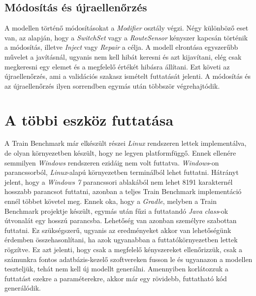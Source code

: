 \subsection{Módosítás és újraellenőrzés}

A modellen történő módosításokat a \emph{Modifier} osztály végzi. Négy különböző eset van, az alapján, hogy a \emph{SwitchSet} vagy a \emph{RouteSensor} kényszer kapcsán történik a módosítás, illetve \emph{Inject} vagy \emph{Repair} a célja. A modell elrontása egyszerűbb művelet a javításnál, ugyanis nem kell hibát keresni és azt kijavítani, elég csak megkeresni egy elemet és a megfelelő értékét hibásra állítani. Ezt követi az újraellenőrzés, ami a validációs szakasz ismételt futtatását jelenti. A módosítás és az újraellenőrzés ilyen sorrendben egymás után többször végrehajtódik.

\section{A többi eszköz futtatása}

A Train Benchmark már elkészült részei \emph{Linux} rendszeren lettek implementálva, de olyan környezetben készült, hogy ne legyen platformfüggő. Ennek ellenére semmilyen \emph{Windows} rendszeren ezidáig nem volt futtatva. \emph{Windows}-on parancssorból, \emph{Linux}-alapú környezetben terminálból lehet futtatni. Hátrányt jelent, hogy a \emph{Windows 7} parancssori ablakából nem lehet 8191 karakternél hosszabb parancsot futtatni\cite{cmdLimitation}, azonban a teljes Train Benchmark implementáció ennél többet követel meg. Ennek oka, hogy a \emph{Gradle}, melyben a Train Benchmark projektje készült, egymás után fűzi a futtatandó \emph{Java} \emph{class}-ok útvonalát egy hosszú parancsba. Lehetőség van azonban személyre szabottan futtatni. Ez szükségszerű, ugyanis az eredményeket akkor van lehetőségünk érdemben összehasonlítani, ha azok ugyanabban a futtatókörnyezetben lettek rögzítve. Ez azt jelenti, hogy csak a megfelelő kényszereket ellenőrizzük, csak a számunkra fontos adatbázis-kezelő szoftvereken fusson le és ugyanazon a modellen teszteljük, tehát nem kell új modellt generálni. Amennyiben korlátozzuk a futtatást ezekre a paraméterekre, akkor már egy rövidebb, futtatható kód generálódik.